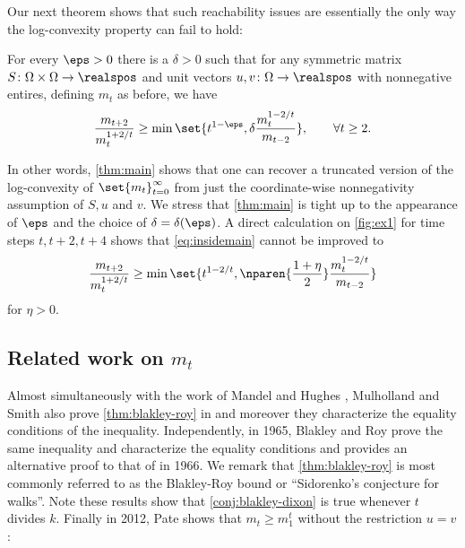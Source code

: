 Our next theorem shows that such reachability issues 
are essentially the only way the log-convexity property 
can fail to hold:
\begin{theorem}
\label{thm:main}
For every $\eps>0$ there is a $\delta>0$ such that 
for any symmetric matrix 
$S\colon\Omega\times\Omega\to\realspos$ and unit 
vectors $u,v\colon\Omega\to\realspos$ with nonnegative 
entires, defining $m_t$ as before, we have
\begin{align}
\frac{m_{t+2}}{m_{t}^{1+2/t}}\ge
\min\set{t^{1-\eps}, \delta\frac{m_t^{1-2/t}}
{m_{t-2}}},\quad\quad\forall t\ge 2.
\label{eq:insidemain}
\end{align}
\end{theorem}
In other words, \autoref{thm:main} shows that one can recover a
truncated version of the log-convexity of
$\set{m_t}_{t=0}^\infty$ from just the coordinate-wise
nonnegativity assumption of $S,u$ and $v$.
We stress that \autoref{thm:main} is tight 
up to the appearance of $\eps$ and the choice of 
$\delta=\delta(\eps)$. A direct calculation
on \autoref{fig:ex1} for time steps $t, t+2, t+4$ 
shows that \autoref{eq:insidemain} cannot be improved to
\begin{align*}
\frac{m_{t+2}}{m_{t}^{1+2/t}}\ge
\min\set{t^{1-2/t}, 
\nparen{\frac{1+\eta}{2}}\frac{m_t^{1-2/t}}{m_{t-2}}}
\end{align*} for $\eta>0$.

\subsection{Related work on $m_t$}
\label{sec:relatedwork}
Almost simultaneously with the work of Mandel and Hughes
\cite{MandelH1958}, Mulholland and Smith also prove
\autoref{thm:blakley-roy} in \cite{MulhollandS1959} and 
moreover they characterize the equality conditions of 
the inequality. Independently, in 1965, Blakley and Roy 
\cite{BlakleyR1965} prove the same inequality and
characterize the equality conditions and 
\cite{London1966} provides an alternative proof to that 
of \cite{MulhollandS1959} in 1966.
We remark that \autoref{thm:blakley-roy} is 
most commonly referred to as the Blakley-Roy bound
or ``Sidorenko's conjecture for walks''.
Note these results show that \autoref{conj:blakley-dixon} 
is true whenever $t$ divides $k$. 
Finally in 2012, Pate shows that $m_t\ge m_1^t$ 
without the restriction $u=v$:

